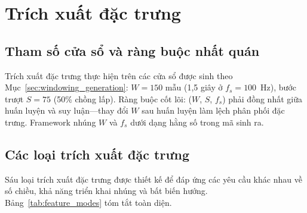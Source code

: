 \section{Trích xuất đặc trưng}
\label{sec:feature_extraction}

\subsection{Tham số cửa sổ và ràng buộc nhất quán}

Trích xuất đặc trưng thực hiện trên các cửa sổ được sinh theo Mục~\ref{sec:windowing_generation}: $W = 150$ mẫu (1,5 giây ở $f_s = 100$~Hz), bước trượt $S = 75$ (50\% chồng lấp). Ràng buộc cốt lõi: ($W$, $S$, $f_s$) phải đồng nhất giữa huấn luyện và suy luận---thay đổi $W$ sau huấn luyện làm lệch phân phối đặc trưng. Framework nhúng $W$ và $f_s$ dưới dạng hằng số trong mã sinh ra.

\subsection{Các loại trích xuất đặc trưng}
\label{sec:feature_modes}

Sáu loại trích xuất đặc trưng được thiết kế để đáp ứng các yêu cầu khác nhau về số chiều, khả năng triển khai nhúng và bất biến hướng. Bảng~\ref{tab:feature_modes} tóm tắt toàn diện.

